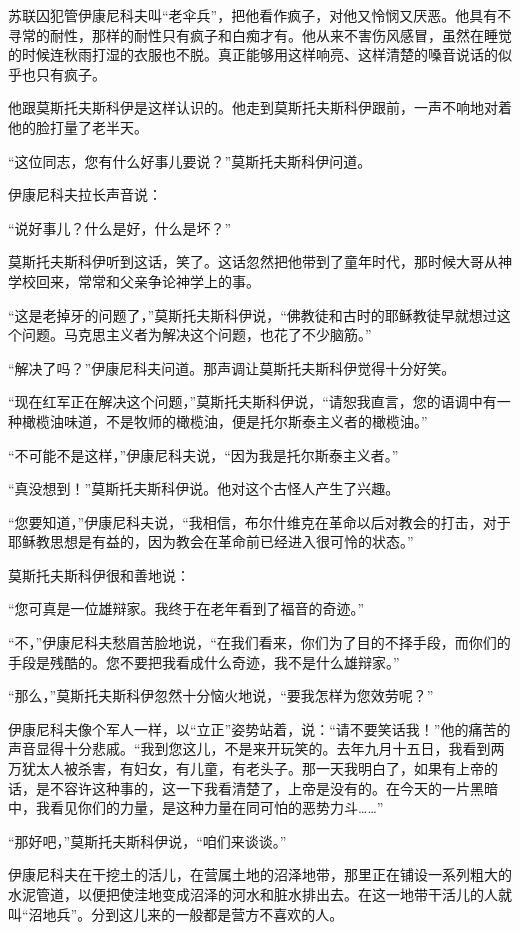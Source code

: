 苏联囚犯管伊康尼科夫叫“老伞兵”，把他看作疯子，对他又怜悯又厌恶。他具有不寻常的耐性，那样的耐性只有疯子和白痴才有。他从来不害伤风感冒，虽然在睡觉的时候连秋雨打湿的衣服也不脱。真正能够用这样响亮、这样清楚的嗓音说话的似乎也只有疯子。

他跟莫斯托夫斯科伊是这样认识的。他走到莫斯托夫斯科伊跟前，一声不响地对着他的脸打量了老半天。

“这位同志，您有什么好事儿要说？”莫斯托夫斯科伊问道。

伊康尼科夫拉长声音说：

“说好事儿？什么是好，什么是坏？”

莫斯托夫斯科伊听到这话，笑了。这话忽然把他带到了童年时代，那时候大哥从神学校回来，常常和父亲争论神学上的事。

“这是老掉牙的问题了，”莫斯托夫斯科伊说，“佛教徒和古时的耶稣教徒早就想过这个问题。马克思主义者为解决这个问题，也花了不少脑筋。”

“解决了吗？”伊康尼科夫问道。那声调让莫斯托夫斯科伊觉得十分好笑。

“现在红军正在解决这个问题，”莫斯托夫斯科伊说，“请恕我直言，您的语调中有一种橄榄油味道，不是牧师的橄榄油，便是托尔斯泰主义者的橄榄油。”

“不可能不是这样，”伊康尼科夫说，“因为我是托尔斯泰主义者。”

“真没想到！”莫斯托夫斯科伊说。他对这个古怪人产生了兴趣。

“您要知道，”伊康尼科夫说，“我相信，布尔什维克在革命以后对教会的打击，对于耶稣教思想是有益的，因为教会在革命前已经进入很可怜的状态。”

莫斯托夫斯科伊很和善地说：

“您可真是一位雄辩家。我终于在老年看到了福音的奇迹。”

“不，”伊康尼科夫愁眉苦脸地说，“在我们看来，你们为了目的不择手段，而你们的手段是残酷的。您不要把我看成什么奇迹，我不是什么雄辩家。”

“那么，”莫斯托夫斯科伊忽然十分恼火地说，“要我怎样为您效劳呢？”

伊康尼科夫像个军人一样，以“立正”姿势站着，说：“请不要笑话我！”他的痛苦的声音显得十分悲戚。“我到您这儿，不是来开玩笑的。去年九月十五日，我看到两万犹太人被杀害，有妇女，有儿童，有老头子。那一天我明白了，如果有上帝的话，是不容许这种事的，这一下我看清楚了，上帝是没有的。在今天的一片黑暗中，我看见你们的力量，是这种力量在同可怕的恶势力斗……”

“那好吧，”莫斯托夫斯科伊说，“咱们来谈谈。”

伊康尼科夫在干挖土的活儿，在营属土地的沼泽地带，那里正在铺设一系列粗大的水泥管道，以便把使洼地变成沼泽的河水和脏水排出去。在这一地带干活儿的人就叫“沼地兵”。分到这儿来的一般都是营方不喜欢的人。

